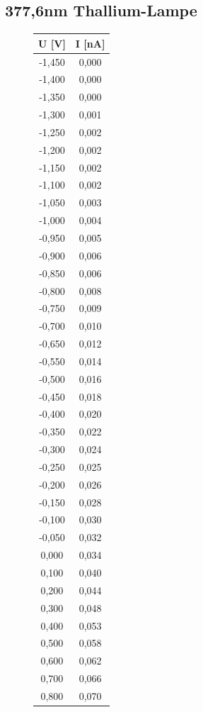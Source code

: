 \documentclass[a4paper, 10pt]{report}%
\begin{document}
\newpage
\subsection{377,6nm Thallium-Lampe}
\begin{figure}[!htbp]
\begin{minipage}[t]{2cm}
\vspace{0pt}
\centering
\begin{center}
\begin{tabular}{c|c}
U [V] & I [nA] \\
\hline
-1,450&	0,000\\
-1,400&	0,000\\
-1,350&	0,000\\
-1,300&	0,001\\
-1,250&	0,002\\
-1,200&	0,002\\
-1,150&	0,002\\
-1,100&	0,002\\
-1,050&	0,003\\
-1,000&	0,004\\
-0,950&	0,005\\
-0,900&	0,006\\
-0,850&	0,006\\
-0,800&	0,008\\
-0,750&	0,009\\
-0,700&	0,010\\
-0,650&	0,012\\
-0,550&	0,014\\
-0,500&	0,016\\
-0,450&	0,018\\
-0,400&	0,020\\
-0,350&	0,022\\
-0,300&	0,024\\
-0,250&	0,025\\
-0,200&	0,026\\
-0,150&	0,028\\
-0,100&	0,030\\
-0,050&	0,032\\
0,000&	0,034\\
0,100&	0,040\\
0,200&	0,044\\
0,300&	0,048\\
0,400&	0,053\\
0,500&	0,058\\
0,600&	0,062\\
0,700&	0,066\\
0,800&	0,070\\

\end{tabular}
\end{center}
\end{minipage}
\end{figure}
\end{document}
